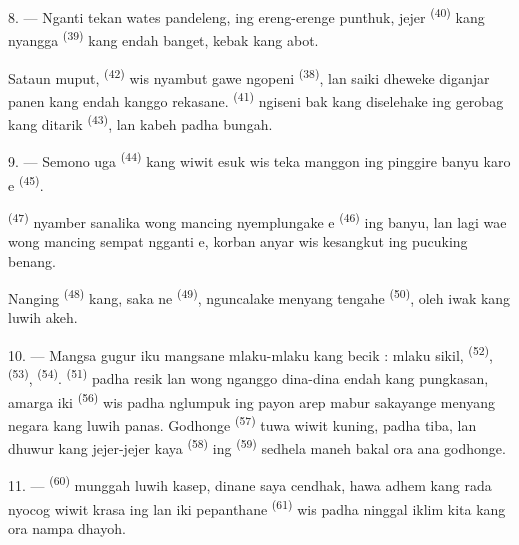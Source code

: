 8. --- Nganti tekan wates pandeleng, ing ereng-erenge punthuk, jejer
 \textsuperscript{(40)} kang nyangga  \textsuperscript{(39)} kang endah banget, kebak 
kang abot.

Sataun muput,  \textsuperscript{(42)} wis
nyambut gawe ngopeni  \textsuperscript{(38)}, lan
saiki dheweke diganjar panen kang endah kanggo rekasane.  \textsuperscript{(41)} ngiseni bak kang
diselehake ing gerobag kang ditarik 
\textsuperscript{(43)}, lan kabeh padha bungah.

\VUsaut{5.0mm}
\VUsaut{3.4mm}

9. --- Semono uga  \textsuperscript{(44)} kang wiwit
esuk wis teka manggon ing pinggire banyu karo e
\textsuperscript{(45)}.

 \textsuperscript{(47)} nyamber  sanalika
wong mancing nyemplungake e \textsuperscript{(46)} ing
banyu, lan lagi wae wong mancing sempat ngganti e,
korban anyar wis kesangkut ing pucuking benang.

Nanging  \textsuperscript{(48)} kang, saka
ne \textsuperscript{(49)}, nguncalake  menyang
tengahe  \textsuperscript{(50)}, oleh iwak kang luwih akeh.

10. --- Mangsa gugur iku mangsane mlaku-mlaku kang becik : mlaku sikil,
 \textsuperscript{(52)}, 
\textsuperscript{(53)},  \textsuperscript{(54)}.
 \textsuperscript{(51)} padha resik lan wong nganggo
dina-dina endah kang pungkasan, amarga iki 
\textsuperscript{(56)} wis padha nglumpuk ing payon arep mabur sakayange
menyang negara kang luwih panas. Godhonge 
\textsuperscript{(57)} tuwa wiwit kuning,  padha tiba,
lan  dhuwur kang jejer-jejer kaya 
\textsuperscript{(58)} ing  \textsuperscript{(59)}
sedhela maneh bakal ora ana godhonge.

11. ---  \textsuperscript{(60)} munggah luwih kasep,
dinane saya cendhak, hawa adhem kang rada nyocog wiwit krasa ing
 lan iki pepanthane 
\textsuperscript{(61)} wis padha ninggal iklim kita kang ora nampa
dhayoh.

\VUsaut{6.0mm}
\VUfilet{22mm}
